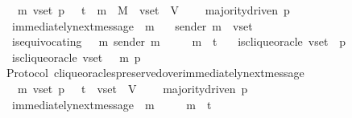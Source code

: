 \begin{isabellebody}
\ \ {\isachardoublequoteopen}{\isasymforall}\ {\isasymsigma}\ m\ v{\isacharunderscore}set\ p{\isachardot}\ {\isasymsigma}\ {\isasymin}\ {\isasymSigma}t\ {\isasymand}\ m\ {\isasymin}\ M\ {\isasymand}\ v{\isacharunderscore}set\ {\isasymsubseteq}\ V\ \isanewline
\ \ {\isasymlongrightarrow}\ majority{\isacharunderscore}driven\ p\isanewline
\ \ {\isasymlongrightarrow}\ immediately{\isacharunderscore}next{\isacharunderscore}message\ {\isacharparenleft}{\isasymsigma}{\isacharcomma}\ m{\isacharparenright}\isanewline
\ \ {\isasymlongrightarrow}\ sender\ m\ {\isasymin}\ v{\isacharunderscore}set\isanewline
\ \ {\isasymlongrightarrow}\ is{\isacharunderscore}equivocating\ {\isacharparenleft}{\isasymsigma}\ {\isasymunion}\ {\isacharbraceleft}m{\isacharbraceright}{\isacharparenright}\ {\isacharparenleft}sender\ m{\isacharparenright}\isanewline
\ \ {\isasymlongrightarrow}\ {\isasymsigma}\ {\isasymunion}\ {\isacharbraceleft}m{\isacharbraceright}\ {\isasymin}\ {\isasymSigma}t\isanewline
\ \ {\isasymlongrightarrow}\ is{\isacharunderscore}clique{\isacharunderscore}oracle\ {\isacharparenleft}v{\isacharunderscore}set{\isacharcomma}\ {\isasymsigma}{\isacharcomma}\ p{\isacharparenright}\ \isanewline
\ \ {\isasymlongrightarrow}\ is{\isacharunderscore}clique{\isacharunderscore}oracle\ {\isacharparenleft}v{\isacharunderscore}set{\isacharcomma}\ {\isasymsigma}\ {\isasymunion}\ {\isacharbraceleft}m{\isacharbraceright}{\isacharcomma}\ p{\isacharparenright}{\isachardoublequoteclose}\isanewline
\ \ \isanewline
%
\isadelimproof
\ \ %
\endisadelimproof
%
\isatagproof
{}\isamarkupfalse%
%
\endisatagproof
{\isafoldproof}%
%
\isadelimproof
\isanewline
%
\endisadelimproof
\isanewline
\isanewline
\isanewline
{}\isamarkupfalse%
\ {\isacharparenleft}\ Protocol{\isacharparenright}\ clique{\isacharunderscore}oracles{\isacharunderscore}preserved{\isacharunderscore}over{\isacharunderscore}immediately{\isacharunderscore}next{\isacharunderscore}message\ {\isacharcolon}\isanewline
\ \ {\isachardoublequoteopen}{\isasymforall}\ {\isasymsigma}\ m\ v{\isacharunderscore}set\ p{\isachardot}\ {\isasymsigma}\ {\isasymin}\ {\isasymSigma}t\ {\isasymand}\ v{\isacharunderscore}set\ {\isasymsubseteq}\ V\ \isanewline
\ \ {\isasymlongrightarrow}\ majority{\isacharunderscore}driven\ p\isanewline
\ \ {\isasymlongrightarrow}\ immediately{\isacharunderscore}next{\isacharunderscore}message\ {\isacharparenleft}{\isasymsigma}{\isacharcomma}\ m{\isacharparenright}\isanewline
\ \ {\isasymlongrightarrow}\ {\isasymsigma}\ {\isasymunion}\ {\isacharbraceleft}m{\isacharbraceright}\ {\isasymin}\ {\isasymSigma}t\isanewline

\end{isabellebody}
